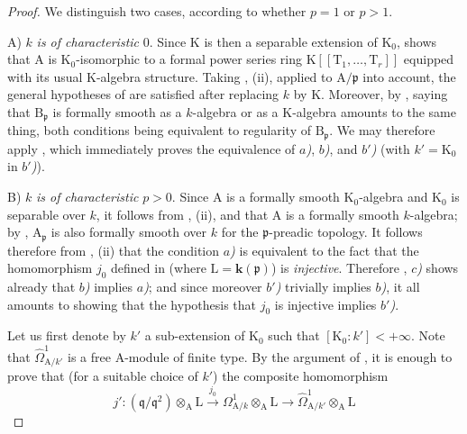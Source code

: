 \begin{proof}
We distinguish two cases, according to whether $p=1$ or $p>1$.

A) $k$ \emph{is of characteristic} $0$.
Since $\mathrm{K}$ is then a separable extension of $\mathrm{K}_0$,
 shows that $\mathrm{A}$ is $\mathrm{K}_0$-isomorphic to a
formal power series ring $\mathrm{K}[[\mathrm{T}_1,\ldots,\mathrm{T}_r]]$
equipped with its usual $\mathrm{K}$-algebra structure. Taking
, (ii), applied to $\mathrm{A}/\mathfrak{p}$ into account, the
general hypotheses of  are satisfied after replacing $k$ by
$\mathrm{K}$. Moreover, by , saying that
$\mathrm{B}_\mathfrak{p}$ is formally smooth as a $k$-algebra or as a
$\mathrm{K}$-algebra amounts to the same thing, both conditions being
equivalent to regularity of $\mathrm{B}_\mathfrak{p}$. We may therefore apply
, which immediately proves the equivalence of \emph{$a$)}, \emph{$b$)}, and
\emph{$b'$)} (with $k'=\mathrm{K}_0$ in \emph{$b'$)}).

B) $k$ \emph{is of characteristic} $p>0$.
Since $\mathrm{A}$ is a formally smooth $\mathrm{K}_0$-algebra and
$\mathrm{K}_0$ is separable over $k$, it follows from , (ii),
and  that $\mathrm{A}$ is a formally smooth $k$-algebra; by
, $\mathrm{A}_\mathfrak{p}$ is also formally smooth over $k$
for the $\mathfrak{p}$-preadic topology.
It follows therefore from , (ii) that the condition \emph{$a$)} is equivalent to the fact that the homomorphism $j_0$ defined in  (where $\mathrm{L}=\boldsymbol{k}(\mathfrak{p})$) is \emph{injective}.
Therefore , \emph{$c$)} shows already that \emph{$b$)} implies \emph{$a$)}; and since moreover \emph{$b'$)} trivially implies \emph{$b$)}, it all amounts to showing that the hypothesis that $j_0$ is injective implies \emph{$b'$)}.

Let us first denote by $k'$ a sub-extension of $\mathrm{K}_0$ such that $[\mathrm{K}_0:k']<+\infty$.
Note that $\widehat{\Omega}^1_{\mathrm{A}/k'}$ is a free $\mathrm{A}$-module of finite type.
By the argument of , it is enough to prove that (for a suitable
choice of $k'$) the composite homomorphism
\[
\label{0.22.7.3.1}
  j':(\mathfrak{q}/\mathfrak{q}^2)\otimes_\mathrm{A}\mathrm{L}\xrightarrow{j_0}\Omega^1_{\mathrm{A}/k}\otimes_\mathrm{A}\mathrm{L}\to\widehat{\Omega}^1_{\mathrm{A}/k'}\otimes_\mathrm{A}\mathrm{L}
  \tag{22.7.3.1}
\]



\end{proof}
